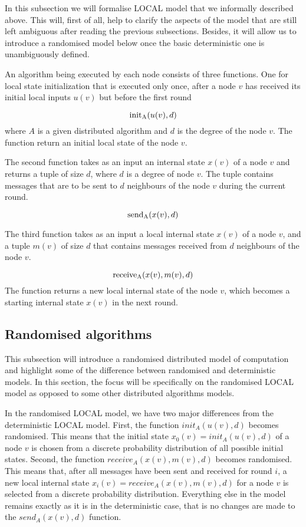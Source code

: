 In this subsection we will formalise LOCAL model that we informally described above.
This will, first of all, help to clarify the aspects of the model that are still left ambiguous
after reading the previous subsections. Besides, it will allow us to introduce
a randomised model below once the basic deterministic one is unambiguously defined.

An algorithm being executed by each node consists of 
three functions. One for local state initialization that is executed only once, after
a node $v$ has received its initial local inputs $u(v)$ but before the first round

$$\init_A(u(v), d)$$
where $A$ is a given distributed algorithm and $d$ is the degree of the node $v$.
The function return an initial local state of the node $v$.

The second function takes as an input an internal state $x(v)$ of a node $v$
and returns a tuple of size $d$, where $d$ is a degree of node $v$. The
tuple contains messages that are to be sent to $d$ neighbours of the node $v$
during the current round.

$$\send_A(x(v), d)$$

The third function takes as an input a local internal state $x(v)$ of a node
$v$, and a tuple $m(v)$ of size $d$ that contains messages received from $d$ neighbours
of the node $v$.

$$\receive_A(x(v), m(v), d)$$
The function returns a new local internal state of the node $v$, which becomes a
starting internal state $x(v)$ in the next round.

\subsection{Randomised algorithms}

This subsection will introduce a randomised distributed model of computation
and highlight some of the difference between randomised and deterministic
models. In this section, the focus will be specifically on the randomised LOCAL
model as opposed to some other distributed algorithms models.

In the randomised LOCAL model, we have two major differences from the
deterministic LOCAL model. First, the function $init_A(u(v), d)$ becomes
randomised. This means that the initial state $x_0(v) = init_A(u(v), d)$ of a node $v$ is
chosen from a discrete probability distribution of all possible initial states.
Second, the function $receive_A(x(v), m(v), d)$ becomes randomised. This means that,
after all messages have been sent and received for round $i$, a new local internal
state $x_i(v) = receive_A(x(v), m(v), d)$ for a node $v$ is selected from a
discrete probability distribution. Everything else in the model remains exactly
as it is in the deterministic case, that is no changes are made to the $send_A(x(v), d)$
function.

